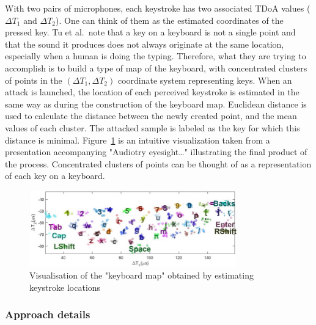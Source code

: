 \documentclass[../main.tex]{subfiles}
\begin{document}
With two pairs of microphones, each keystroke has two associated TDoA values
($\Delta T_1$ and $\Delta T_2$). One can think of them as the estimated coordinates
of the pressed key. Tu et al.\ note that a key on a keyboard is not a single point
and that the sound it produces does not always originate at the same location, especially
when a human is doing the typing.
Therefore, what they are trying to accomplish is to build a type of map of the keyboard, with
concentrated clusters of points in the $(\Delta T_1, \Delta T_2)$ coordinate system representing
keys.
When an attack is launched, the location of each perceived keystroke is estimated in the same way
as during the construction of the keyboard map. Euclidean distance is used to calculate the distance
between the newly created point, and the mean values of each cluster. The attacked sample is labeled
as the key for which this distance is minimal. Figure~\ref{fig:auditory_eyesight_keyboard_map} is an intuitive visualization taken from a presentation  accompanying
"Audiotry eyesight\ldots{}"\cite{presentation_unconstrained2023} illustrating the final product of the process.
Concentrated clusters of points can be thought of as a representation of each key on a keyboard. 

\begin{figure}[H]
    \centering
    \includegraphics[width=0.8\textwidth]{figures/auditory_eyesight_keyboard_map.png}
    \caption{Visualisation of the "keyboard map" obtained by estimating keystroke locations}
    \label{fig:auditory_eyesight_keyboard_map}
\end{figure}


\subsubsection{Approach details} \label{sec:approach_details}
\end{document}

